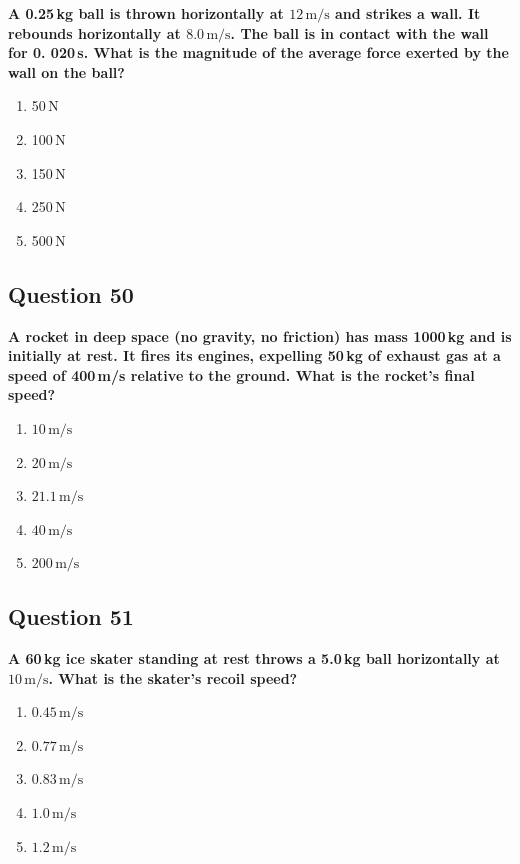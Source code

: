 \documentclass[12pt,letterpaper]{article}
\begin{document}
\begin{questionbox}
\textbf{A 0.25\,kg ball is thrown horizontally at $12\,\text{m/s}$ and strikes a wall. It rebounds horizontally at $8.0\,\text{m/s}$. The ball is in contact with the wall for 0.
020\,s. What is the magnitude of the average force exerted by the wall on the ball?}

\begin{enumerate}[label=\alph*)]
    \item 50\,N
    \item 100\,N
    \item 150\,N
    \item 250\,N
    \item 500\,N
\end{enumerate}
\end{questionbox}

\subsection{Question 50}

\begin{questionbox}
\textbf{A rocket in deep space (no gravity, no friction) has mass 1000\,kg and is initially at rest. It fires its engines, expelling 50\,kg of exhaust gas at a speed of 400\,m/s relative to the ground. What is the rocket's final speed?}

\begin{enumerate}[label=\alph*)]
    \item $10\,\text{m/s}$
    \item $20\,\text{m/s}$
    \item $21.1\,\text{m/s}$
    \item $40\,\text{m/s}$
    \item $200\,\text{m/s}$
\end{enumerate}
\end{questionbox}

\subsection{Question 51}

\begin{questionbox}
\textbf{A 60\,kg ice skater standing at rest throws a 5.0\,kg ball horizontally at $10\,\text{m/s}$. What is the skater's recoil speed?}

\begin{enumerate}[label=\alph*)]
    \item $0.45\,\text{m/s}$
    \item $0.77\,\text{m/s}$
    \item $0.83\,\text{m/s}$
    \item $1.0\,\text{m/s}$
    \item $1.2\,\text{m/s}$
\end{enumerate}
\end{questionbox}
\end{document}
